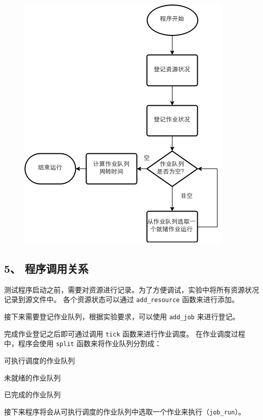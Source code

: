 \documentclass[12bp]{guo}
\begin{document}
\begin{figure}[h!]
    \centering
        \includegraphics[scale=0.75]{figures/2.flow.png}
\end{figure}

\subsection{5、 程序调用关系}

测试程序启动之前，需要对资源进行记录。为了方便调试，实验中将所有资源状况记录到源文件中。
各个资源状态可以通过 \texttt{add_resource} 函数来进行添加。


接下来需要登记作业队列，根据实验要求，可以使用 \texttt{add_job} 来进行登记。


完成作业登记之后即可通过调用 \texttt{tick} 函数来进行作业调度。
在作业调度过程中，程序会使用 \texttt{split} 函数来将作业队列分割成：

\begin{description}
    \item{可执行调度的作业队列}
    \item{未就绪的作业队列}
    \item{已完成的作业队列}
\end{description}


接下来程序将会从可执行调度的作业队列中选取一个作业来执行（\texttt{job_run}）。
\end{document}
